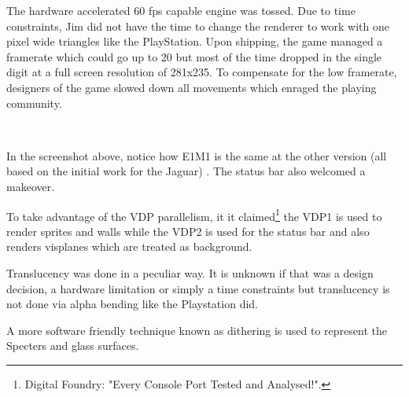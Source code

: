 \par
The hardware accelerated 60 fps capable engine was tossed. Due to time constraints, Jim did not have the time to change the renderer to work with one pixel wide triangles like the PlayStation. Upon shipping, the game managed a framerate which could go up to 20 but most of the time dropped in the single digit at a full screen resolution of 281x235. To compensate for the low framerate, designers of the game slowed down all movements which enraged the playing community.\\
\par
{}







\\
\par
In the screenshot above, notice how E1M1 is the same at the other version (all based on the initial work for the Jaguar) . The status bar also welcomed a makeover.\\
\par
To take advantage of the VDP parallelism, it it claimed\footnote{Digital Foundry: "Every Console Port Tested and Analysed!".} the VDP1 is used to render sprites and walls while the VDP2 is used for the status bar and also renders visplanes which are treated as background.\\
\par 
Translucency was done in a peculiar way. It is unknown if that was a design decision, a hardware limitation or simply a time constraints but translucency is not done via alpha bending like the Playstation did.\\
\par
 A more software friendly technique known as dithering is used to represent the Specters and glass surfaces.







\par
{}


